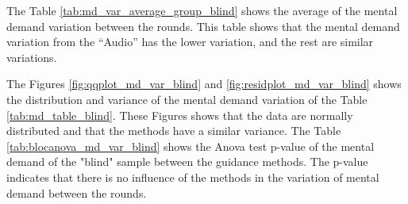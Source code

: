 
%

The Table \ref{tab:md_var_average_group_blind} shows the average of the mental demand variation between the rounds. This table shows that the mental demand variation from the “Audio” has the lower variation, and the rest are similar variations.



The Figures \ref{fig:qqplot_md_var_blind} and \ref{fig:residplot_md_var_blind} shows the distribution and variance of the mental demand variation of the Table \ref{tab:md_table_blind}. These Figures shows that the data are normally distributed and that the methods have a similar variance.
The Table \ref{tab:blocanova_md_var_blind} shows the Anova test p-value of the mental demand of the "blind" sample between the guidance methods. The p-value indicates that there is no influence of the methods in the variation of mental demand between the rounds. 



